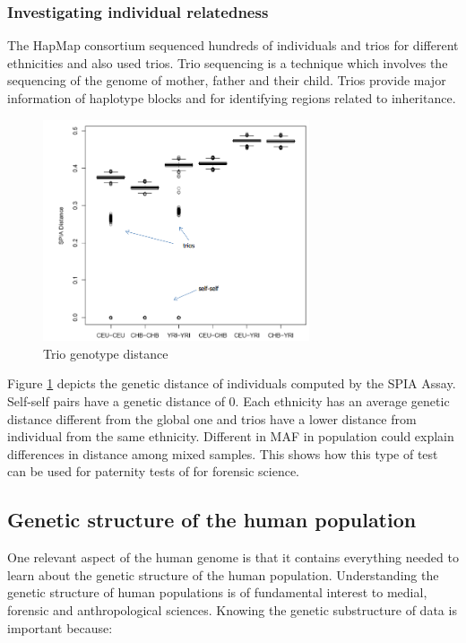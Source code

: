 		\subsubsection{Investigating individual relatedness}
		The HapMap consortium sequenced hundreds of individuals and trios for different ethnicities and also used trios.
		Trio sequencing is a technique which involves the sequencing of the genome of mother, father and their child.
		Trios provide major information of haplotype blocks and for identifying regions related to inheritance.

		\begin{figure}[H]
			\centering
			\includegraphics[width = 0.7\textwidth]{relatedness.PNG}
			\caption{Trio genotype distance}
			\label{fig:trios}
		\end{figure}

		Figure \ref{fig:trios} depicts the genetic distance of individuals computed by the SPIA Assay.
		Self-self pairs have a genetic distance of $0$.
		Each ethnicity has an average genetic distance different from the global one and trios have a lower distance from individual from the same ethnicity.
		Different in MAF in population could explain differences in distance among mixed samples.
		This shows how this type of test can be used for paternity tests of for forensic science.

	\subsection{Genetic structure of the human population}
	One relevant aspect of the human genome is that it contains everything needed to learn about the genetic structure of the human population.
	Understanding the genetic structure of human populations is of fundamental interest to medial, forensic and anthropological sciences.
	Knowing the genetic substructure of data is important because:

